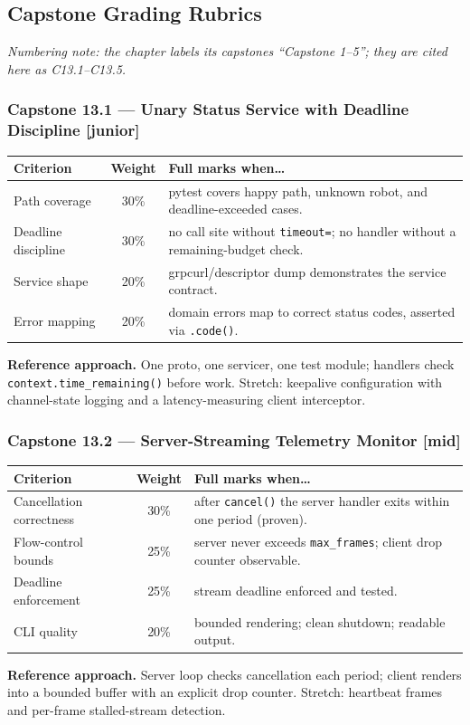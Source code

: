 \subsection{Capstone Grading Rubrics}

\emph{Numbering note: the chapter labels its capstones ``Capstone 1--5'';
they are cited here as C13.1--C13.5.}

\subsubsection*{Capstone 13.1 --- Unary Status Service with Deadline Discipline [junior]}
\begin{center}\small
\begin{tabularx}{\textwidth}{l c X}
\toprule
\textbf{Criterion} & \textbf{Weight} & \textbf{Full marks when\ldots} \\
\midrule
Path coverage & 30\% & pytest covers happy path, unknown robot, and deadline-exceeded cases. \\
Deadline discipline & 30\% & no call site without \texttt{timeout=}; no handler without a remaining-budget check. \\
Service shape & 20\% & grpcurl/descriptor dump demonstrates the service contract. \\
Error mapping & 20\% & domain errors map to correct status codes, asserted via \texttt{.code()}. \\
\bottomrule
\end{tabularx}
\end{center}
\textbf{Reference approach.} One proto, one servicer, one test module;
handlers check \texttt{context.time\_remaining()} before work. Stretch:
keepalive configuration with channel-state logging and a latency-measuring
client interceptor.

\subsubsection*{Capstone 13.2 --- Server-Streaming Telemetry Monitor [mid]}
\begin{center}\small
\begin{tabularx}{\textwidth}{l c X}
\toprule
\textbf{Criterion} & \textbf{Weight} & \textbf{Full marks when\ldots} \\
\midrule
Cancellation correctness & 30\% & after \texttt{cancel()} the server handler exits within one period (proven). \\
Flow-control bounds & 25\% & server never exceeds \texttt{max\_frames}; client drop counter observable. \\
Deadline enforcement & 25\% & stream deadline enforced and tested. \\
CLI quality & 20\% & bounded rendering; clean shutdown; readable output. \\
\bottomrule
\end{tabularx}
\end{center}
\textbf{Reference approach.} Server loop checks cancellation each period;
client renders into a bounded buffer with an explicit drop counter.
Stretch: heartbeat frames and per-frame stalled-stream detection.

